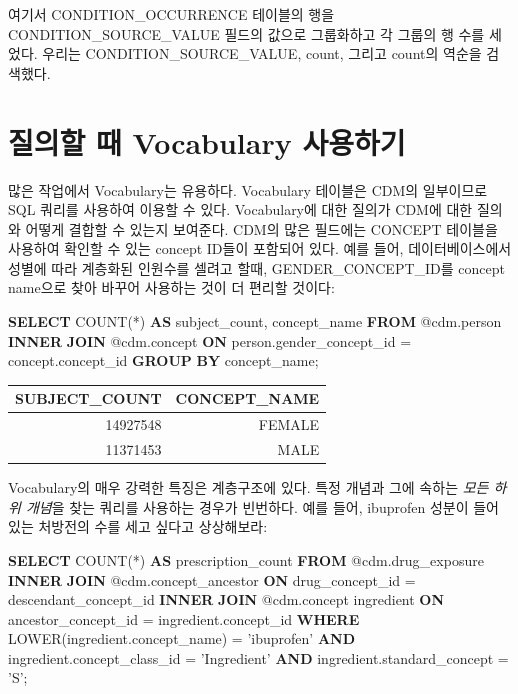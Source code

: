 \documentclass[11pt]{book}
\newenvironment{Shaded}{\begin{snugshade}}{\end{snugshade}}
\newcommand{\KeywordTok}[1]{\textcolor[rgb]{0.13,0.29,0.53}{\textbf{#1}}}
\newcommand{\StringTok}[1]{\textcolor[rgb]{0.31,0.60,0.02}{#1}}
\newcommand{\FunctionTok}[1]{\textcolor[rgb]{0.00,0.00,0.00}{#1}}
\newcommand{\NormalTok}[1]{#1}
\theoremstyle{definition}
\theoremstyle{definition}
\theoremstyle{definition}
\theoremstyle{remark}
\begin{document}
여기서 CONDITION\_OCCURRENCE 테이블의 행을 CONDITION\_SOURCE\_VALUE
필드의 값으로 그룹화하고 각 그룹의 행 수를 세었다. 우리는
CONDITION\_SOURCE\_VALUE, count, 그리고 count의 역순을 검색했다.

\section{질의할 때 Vocabulary 사용하기}\label{--vocabulary-}

많은 작업에서 Vocabulary는 유용하다. Vocabulary 테이블은 CDM의
일부이므로 SQL 쿼리를 사용하여 이용할 수 있다. Vocabulary에 대한 질의가
CDM에 대한 질의와 어떻게 결합할 수 있는지 보여준다. CDM의 많은 필드에는
CONCEPT 테이블을 사용하여 확인할 수 있는 concept ID들이 포함되어 있다.
예를 들어, 데이터베이스에서 성별에 따라 계층화된 인원수를 셀려고 할때,
GENDER\_CONCEPT\_ID를 concept name으로 찾아 바꾸어 사용하는 것이 더
편리할 것이다:

\begin{Shaded}
\begin{Highlighting}[]
\KeywordTok{SELECT} \FunctionTok{COUNT}\NormalTok{(*) }\KeywordTok{AS}\NormalTok{ subject_count,}
\NormalTok{  concept_name}
\KeywordTok{FROM}\NormalTok{ @cdm.person}
\KeywordTok{INNER} \KeywordTok{JOIN}\NormalTok{ @cdm.concept}
  \KeywordTok{ON}\NormalTok{ person.gender_concept_id = concept.concept_id}
\KeywordTok{GROUP} \KeywordTok{BY}\NormalTok{ concept_name;}
\end{Highlighting}
\end{Shaded}

\begin{longtable}[]{@{}rr@{}}
\toprule
SUBJECT\_COUNT & CONCEPT\_NAME\tabularnewline
\midrule
\endhead
14927548 & FEMALE\tabularnewline
11371453 & MALE\tabularnewline
\bottomrule
\end{longtable}

Vocabulary의 매우 강력한 특징은 계층구조에 있다. 특정 개념과 그에 속하는
\emph{모든 하위 개념}을 찾는 쿼리를 사용하는 경우가 빈번하다. 예를 들어,
ibuprofen 성분이 들어 있는 처방전의 수를 세고 싶다고 상상해보라:

\begin{Shaded}
\begin{Highlighting}[]
\KeywordTok{SELECT} \FunctionTok{COUNT}\NormalTok{(*) }\KeywordTok{AS}\NormalTok{ prescription_count}
\KeywordTok{FROM}\NormalTok{ @cdm.drug_exposure}
\KeywordTok{INNER} \KeywordTok{JOIN}\NormalTok{ @cdm.concept_ancestor}
  \KeywordTok{ON}\NormalTok{ drug_concept_id = descendant_concept_id}
\KeywordTok{INNER} \KeywordTok{JOIN}\NormalTok{ @cdm.concept ingredient}
  \KeywordTok{ON}\NormalTok{ ancestor_concept_id = ingredient.concept_id}
\KeywordTok{WHERE} \FunctionTok{LOWER}\NormalTok{(ingredient.concept_name) = }\StringTok{'ibuprofen'}
  \KeywordTok{AND}\NormalTok{ ingredient.concept_class_id = }\StringTok{'Ingredient'}
  \KeywordTok{AND}\NormalTok{ ingredient.standard_concept = }\StringTok{'S'}\NormalTok{;}
\end{Highlighting}
\end{Shaded}
\end{document}
